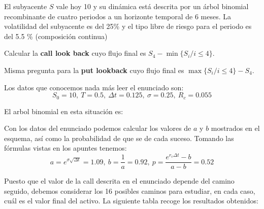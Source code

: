 \begin{problem}[1]
El subyacente $S$ vale hoy 10 y su dinámica está descrita por un árbol binomial recombinante de cuatro periodos a un horizonte temporal de 6 meses. La volatilidad del subyacente es del 25\% y el tipo libre de riesgo para el periodo es del 5.5 \% (composición continua)

\ppart Calcular la \textbf{call look back} cuyo flujo final es $S_4-\min\{S_i/ i\leq 4\}$.

\ppart Misma pregunta para la \textbf{put lookback} cuyo flujo final es $\max\{S_i / i \leq 4\}-S_4$.
\solution


Los datos que conocemos nada más leer el enunciado son:
\[S_0=10, \ T=0.5, \ Δt = 0.125, \ σ=0.25, \ R_c=0.055\]

El arbol binomial en esta situación es:
\begin{center}
\end{center}

Con los datos del enunciado podemos calcular los valores de $a$ y $b$ mostrados en el esquema, así como la probabilidad de que se de cada suceso. Tomando las fórmulas vistas en los apuntes tenemos:
\[a=e^{σ\sqrt{Δt}} = 1.09, \ b = \frac{1}{a} = 0.92, \ p = \frac{e^{r_cΔt}-b}{a-b}=0.52\]

\spart
Puesto que el valor de la call descrita en el enunciado depende del camino seguido, debemos considerar los 16 posibles caminos para estudiar, en cada caso, cuál es el valor final del activo. La siguiente tabla recoge los resultados obtenidos:


\end{problem}
